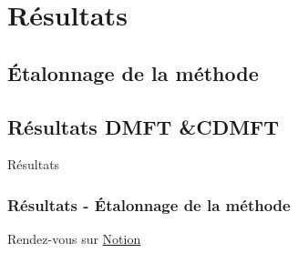 
\section{Résultats}

\subsection{Étalonnage de la méthode}

\subsection{Résultats DMFT \&\;CDMFT}

\begin{frame}
    \vfill
    \begin{center}
        \large
        Résultats
    \end{center}
    \vfill
\end{frame}

\begin{frame}
    \frametitle{Résultats - Étalonnage de la méthode}
    \vfill
    \centering
    Rendez-vous sur \href{https://www.notion.so/A2024-87fcc14d1ac34253b8b1da3adbef9ace}{\textcolor{hard_green}{Notion}}
    \vfill
\end{frame}
